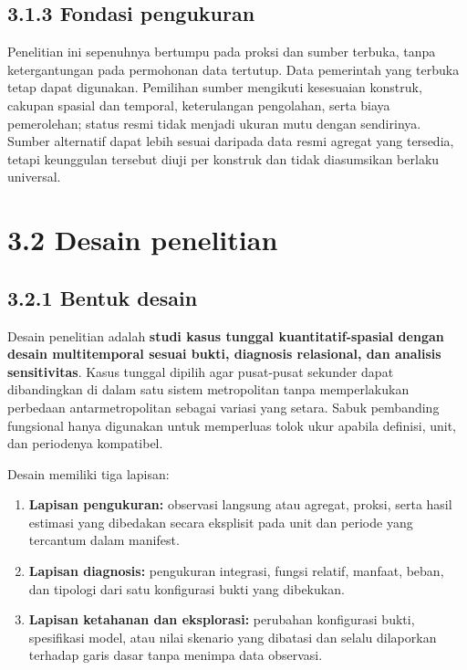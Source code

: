 \documentclass[
  indonesian,
  11pt,
  a4paper,
  oneside,
  openany]{report}
\providecommand{\tightlist}{%
  \setlength{\itemsep}{0pt}\setlength{\parskip}{0pt}}
\begin{document}
\subsection{3.1.3 Fondasi pengukuran}\label{fondasi-pengukuran}

Penelitian ini sepenuhnya bertumpu pada proksi dan sumber terbuka, tanpa
ketergantungan pada permohonan data tertutup. Data pemerintah yang
terbuka tetap dapat digunakan. Pemilihan sumber mengikuti kesesuaian
konstruk, cakupan spasial dan temporal, keterulangan pengolahan, serta
biaya pemerolehan; status resmi tidak menjadi ukuran mutu dengan
sendirinya. Sumber alternatif dapat lebih sesuai daripada data resmi
agregat yang tersedia, tetapi keunggulan tersebut diuji per konstruk dan
tidak diasumsikan berlaku universal.

\section{3.2 Desain penelitian}\label{desain-penelitian}

\subsection{3.2.1 Bentuk desain}\label{bentuk-desain}

Desain penelitian adalah \textbf{studi kasus tunggal kuantitatif-spasial
dengan desain multitemporal sesuai bukti, diagnosis relasional, dan
analisis sensitivitas}. Kasus tunggal dipilih agar pusat-pusat sekunder
dapat dibandingkan di dalam satu sistem metropolitan tanpa memperlakukan
perbedaan antarmetropolitan sebagai variasi yang setara. Sabuk
pembanding fungsional hanya digunakan untuk memperluas tolok ukur
apabila definisi, unit, dan periodenya kompatibel.

Desain memiliki tiga lapisan:

\begin{enumerate}
\def\labelenumi{\arabic{enumi}.}
\tightlist
\item
  \textbf{Lapisan pengukuran:} observasi langsung atau agregat, proksi,
  serta hasil estimasi yang dibedakan secara eksplisit pada unit dan
  periode yang tercantum dalam manifest.
\item
  \textbf{Lapisan diagnosis:} pengukuran integrasi, fungsi relatif,
  manfaat, beban, dan tipologi dari satu konfigurasi bukti yang
  dibekukan.
\item
  \textbf{Lapisan ketahanan dan eksplorasi:} perubahan konfigurasi
  bukti, spesifikasi model, atau nilai skenario yang dibatasi dan selalu
  dilaporkan terhadap garis dasar tanpa menimpa data observasi.
\end{enumerate}
\end{document}

